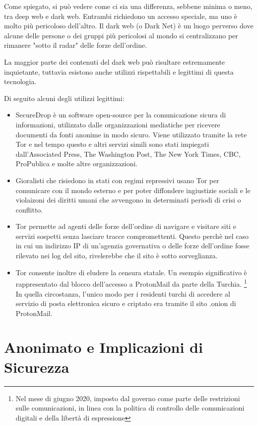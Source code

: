 Come spiegato, si può vedere come ci sia una differenza, sebbene minima o meno, tra deep web e dark web. Entrambi richiedono un accesso speciale, ma uno è molto più pericoloso dell'altro. Il dark web (o Dark Net) è un luogo perverso dove alcune delle persone o dei gruppi più pericolosi al mondo si centralizzano per rimanere "sotto il radar" delle forze dell'ordine.

La maggior parte dei contenuti del dark web può risultare estremamente inquietante, tuttavia esistono anche utilizzi rispettabili e legittimi di questa tecnologia.

Di seguito alcuni degli utilizzi legittimi:

\begin{itemize}
    \item SecureDrop è un software open-source per la comunicazione sicura di informazioni, utilizzato dalle organizzazioni mediatiche per ricevere documenti da fonti anonime in modo sicuro. Viene utilizzato tramite la rete Tor e nel tempo questo e altri servizi simili sono stati impiegati dall'Associated Press, The Washington Post, The New York Times, CBC, ProPublica e molte altre organizzazioni.
    \item Gioralisti che risiedono in stati con regimi repressivi usano Tor per comunicare con il mondo esterno e per poter diffondere ingiustizie sociali e le violaizoni dei diritti umani che avvengono in determinati periodi di crisi o conflitto.
    \item Tor permette ad agenti delle forze dell'ordine di navigare e visitare siti e servizi sospetti senza lasciare tracce compromettenti. Questo perchè nel caso in cui un indirizzo IP di un'agenzia governativa o delle forze dell'ordine fosse rilevato nei log del sito, rivelerebbe che il sito è sotto sorveglianza.
    \item Tor consente inoltre di eludere la censura statale. Un esempio significativo è rappresentato dal blocco dell'accesso a ProtonMail da parte della Turchia. \footnote{Nel mese di giugno 2020, imposto dal governo come parte delle restrizioni sulle comunicazioni, in linea con la politica di controllo delle comunicazioni digitali e della libertà di espressione} In quella circostanza, l'unico modo per i residenti turchi di accedere al servizio di posta elettronica sicuro e criptato era tramite il sito .onion di ProtonMail. \cite{darkweb4}
\end{itemize}

\section{Anonimato e Implicazioni di Sicurezza}\label{sec:cap_sec_darkweb4}


